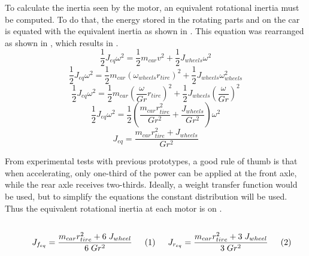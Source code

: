 To calculate the inertia seen by the motor, an equivalent rotational inertia must be computed. To do that, the energy stored in the rotating parts and on the car is equated with the equivalent inertia as shown in . This equation was rearranged as shown in , which results in .
\begin{equation}
	\frac{1}{2}J_{eq}\omega^2 = \frac{1}{2}m_{car}v^2 + \frac{1}{2}J_{wheels}\omega^2
	\label{eq:iner_equivalent0}
\end{equation}
\begin{equation}
	\frac{1}{2}J_{eq}\omega^2 = \frac{1}{2}m_{car}(\omega_{wheels}r_{tire})^2 + \frac{1}{2}J_{wheels}\omega_{wheels}^2
	\label{eq:iner_equivalent1}
\end{equation}
\begin{equation}
	\frac{1}{2}J_{eq}\omega^2 = \frac{1}{2}m_{car}\left(\frac{\omega}{Gr}r_{tire}\right)^2 + \frac{1}{2}J_{wheels}\left(\frac{\omega}{Gr}\right)^2
	\label{eq:iner_equivalent2}
\end{equation}
\begin{equation}
	\frac{1}{2}J_{eq}\omega^2 = \frac{1}{2}\left(\frac{m_{car}r_{tire}^2}{{Gr^2}} + \frac{J_{wheels}}{Gr^2}\right) \omega^2
	\label{eq:iner_equivalent3}
\end{equation}
\begin{equation}
	J_{eq} = \frac{m_{car}r_{tire}^2 + J_{wheels}}{Gr^2}
	\label{eq:iner_equivalent}
\end{equation}

From experimental tests with previous prototypes, a good rule of thumb is that when accelerating, only one-third of the power can be applied at the front axle, while the rear axle receives two-thirds. Ideally, a weight transfer function would be used, but to simplify the equations the constant distribution will be used. Thus the equivalent rotational inertia at each motor is on .

\vspace{0.5cm}
\begin{subequations}
	\centering
	\begin{minipage}{.47\linewidth}
		\begin{equation}
			J_{f_{eq}} = \frac{m_{car}r_{tire}^2 + 6\;J_{wheel}}{6\;Gr^2}
		\end{equation}
	\end{minipage}
	\begin{minipage}{.47\linewidth}
		\begin{equation}
			J_{r_{eq}} = \frac{m_{car}r_{tire}^2 + 3\;J_{wheel}}{3\;Gr^2}
		\end{equation}
	\end{minipage}
	\label{eq:motor_iner_equivalent}
\end{subequations}
\vspace{0.5cm}

